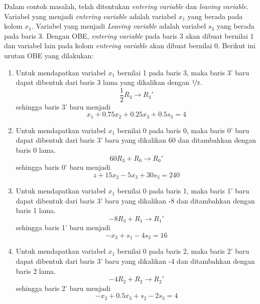 Dalam contoh masalah, telah ditentukan \textit{entering variable} dan \textit{leaving variable}. Variabel yang menjadi \textit{entering variable} adalah variabel \(x_1\) yang berada pada kolom \(x_1\). Variabel yang menjadi \textit{Leaving variable} adalah variabel \(s_3\) yang berada pada baris 3. Dengan OBE, \textit{entering variable} pada baris 3 akan dibuat bernilai 1 dan variabel lain pada kolom \textit{entering variable} akan dibuat bernilai 0. Berikut ini urutan OBE yang dilakukan:
\begin{enumerate}
	\item Untuk mendapatkan variabel \(x_1\) bernilai 1 pada baris 3, maka baris 3' baru dapat dibentuk dari baris 3 lama yang dikalikan dengan \(\nicefrac{1}{2}\).\\
	\begin{equation*}
		\frac{1}{2}R_3 \rightarrow R_3'
	\end{equation*}
	sehingga baris 3' baru menjadi
	\begin{equation*}
		x_1 + 0.75x_2 + 0.25x_3 + 0.5s_3 = 4
	\end{equation*}
	
	\item Untuk mendapatkan variabel \(x_1\) bernilai 0 pada baris 0, maka baris 0' baru dapat dibentuk dari baris 3' baru yang dikalikan 60 dan ditambahkan dengan baris 0 lama.\\
	\begin{equation*}
		60R_3 + R_0 \rightarrow R_0'
	\end{equation*}
	sehingga baris 0' baru menjadi
	\begin{equation*}
		z + 15x_2 - 5x_3 + 30s_3 = 240
	\end{equation*}

	\item Untuk mendapatkan variabel \(x_1\) bernilai 0 pada baris 1, maka baris 1' baru dapat dibentuk dari baris 3' baru yang dikalikan -8 dan ditambahkan dengan baris 1 lama.\\
	\begin{equation*}
		-8R_3 + R_1 \rightarrow R_1'
	\end{equation*}
	sehingga baris 1' baru menjadi
	\begin{equation*}
		-x_3 + s_1 - 4s_3 = 16
	\end{equation*}

	\item Untuk mendapatkan variabel \(x_1\) bernilai 0 pada baris 2, maka baris 2' baru dapat dibentuk dari baris 3' baru yang dikalikan -4 dan ditambahkan dengan baris 2 lama.\\
	\begin{equation*}
		-4R_2 + R_2 \rightarrow R_2'
	\end{equation*}
	sehingga baris 2' baru menjadi
	\begin{equation*}
		-x_2 + 0.5x_3 + s_2 - 2s_3 = 4
	\end{equation*}
\end{enumerate}

